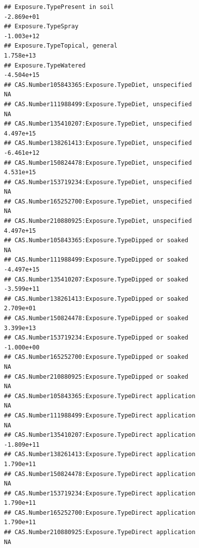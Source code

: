 \documentclass[
  12pt,
]{article}
\begin{document}
\begin{verbatim}
## Exposure.TypePresent in soil                                                    -2.869e+01
## Exposure.TypeSpray                                                              -1.003e+12
## Exposure.TypeTopical, general                                                    1.758e+13
## Exposure.TypeWatered                                                            -4.504e+15
## CAS.Number105843365:Exposure.TypeDiet, unspecified                                      NA
## CAS.Number111988499:Exposure.TypeDiet, unspecified                                      NA
## CAS.Number135410207:Exposure.TypeDiet, unspecified                               4.497e+15
## CAS.Number138261413:Exposure.TypeDiet, unspecified                              -6.461e+12
## CAS.Number150824478:Exposure.TypeDiet, unspecified                               4.531e+15
## CAS.Number153719234:Exposure.TypeDiet, unspecified                                      NA
## CAS.Number165252700:Exposure.TypeDiet, unspecified                                      NA
## CAS.Number210880925:Exposure.TypeDiet, unspecified                               4.497e+15
## CAS.Number105843365:Exposure.TypeDipped or soaked                                       NA
## CAS.Number111988499:Exposure.TypeDipped or soaked                               -4.497e+15
## CAS.Number135410207:Exposure.TypeDipped or soaked                               -3.599e+11
## CAS.Number138261413:Exposure.TypeDipped or soaked                                2.709e+01
## CAS.Number150824478:Exposure.TypeDipped or soaked                                3.399e+13
## CAS.Number153719234:Exposure.TypeDipped or soaked                               -1.000e+00
## CAS.Number165252700:Exposure.TypeDipped or soaked                                       NA
## CAS.Number210880925:Exposure.TypeDipped or soaked                                       NA
## CAS.Number105843365:Exposure.TypeDirect application                                     NA
## CAS.Number111988499:Exposure.TypeDirect application                                     NA
## CAS.Number135410207:Exposure.TypeDirect application                             -1.809e+11
## CAS.Number138261413:Exposure.TypeDirect application                              1.790e+11
## CAS.Number150824478:Exposure.TypeDirect application                                     NA
## CAS.Number153719234:Exposure.TypeDirect application                              1.790e+11
## CAS.Number165252700:Exposure.TypeDirect application                              1.790e+11
## CAS.Number210880925:Exposure.TypeDirect application                                     NA

\end{verbatim}
\end{document}
